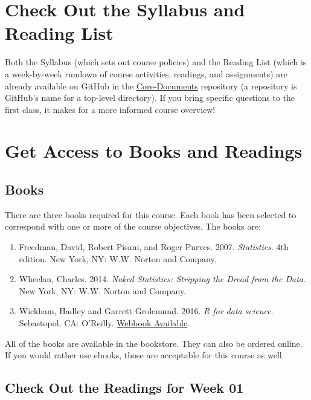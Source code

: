 \documentclass[]{book}
\theoremstyle{definition}
\theoremstyle{definition}
\theoremstyle{remark}
\begin{document}
\section{Check Out the Syllabus and Reading
List}\label{check-out-the-syllabus-and-reading-list}

Both the Syllabus (which sets out course policies) and the Reading List
(which is a week-by-week rundown of course activities, readings, and
assignments) are already available on GitHub in the
\href{https://github.com/slu-soc5050/Core-Documents}{Core-Documents}
repository (a repository is GitHub's name for a top-level directory). If
you bring specific questions to the first class, it makes for a more
informed course overview!

\section{Get Access to Books and
Readings}\label{get-access-to-books-and-readings}

\subsection{Books}\label{books}

There are three books required for this course. Each book has been
selected to correspond with one or more of the course objectives. The
books are:

\begin{enumerate}
\def\labelenumi{\arabic{enumi}.}
\item
  Freedman, David, Robert Pisani, and Roger Purves. 2007.
  \emph{Statistics}. 4th edition. New York, NY: W.W. Norton and Company.
\item
  Wheelan, Charles. 2014. \emph{Naked Statistics: Stripping the Dread
  from the Data}. New York, NY: W.W. Norton and Company.
\item
  Wickham, Hadley and Garrett Grolemund. 2016. \emph{R for data
  science}. Sebastopol, CA: O'Reilly.
  \href{http://r4ds.had.co.nz}{Webbook Available}.
\end{enumerate}

All of the books are available in the bookstore. They can also be
ordered online. If you would rather use ebooks, those are acceptable for
this course as well.

\subsection{Check Out the Readings for Week
01}\label{check-out-the-readings-for-week-01}
\end{document}
